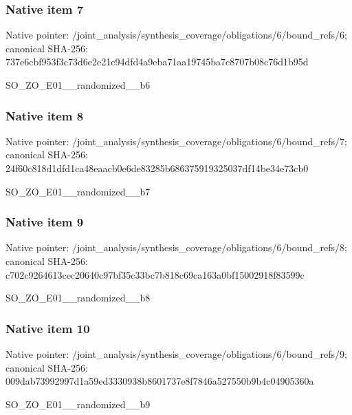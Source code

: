\documentclass[10pt,a4paper]{article}
\begin{document}
\subsubsection{Native item 7}
Native pointer: /joint\_\allowbreak{}analysis/synthesis\_\allowbreak{}coverage/obligations/6/bound\_\allowbreak{}refs/6; canonical SHA-256: 737e6cbf953f3c73d6e2e21c94dfd4a9eba71aa19745ba7c8707b08c76d1b95d

\begingroup\raggedright\sloppy SO\_\allowbreak{}ZO\_\allowbreak{}E01\_\allowbreak{}\_\allowbreak{}randomized\_\allowbreak{}\_\allowbreak{}b6\par\endgroup

\subsubsection{Native item 8}
Native pointer: /joint\_\allowbreak{}analysis/synthesis\_\allowbreak{}coverage/obligations/6/bound\_\allowbreak{}refs/7; canonical SHA-256: 24f60c818d1dfd1ca48eaacb0e6de83285b686375919325037df14be34e73cb0

\begingroup\raggedright\sloppy SO\_\allowbreak{}ZO\_\allowbreak{}E01\_\allowbreak{}\_\allowbreak{}randomized\_\allowbreak{}\_\allowbreak{}b7\par\endgroup

\subsubsection{Native item 9}
Native pointer: /joint\_\allowbreak{}analysis/synthesis\_\allowbreak{}coverage/obligations/6/bound\_\allowbreak{}refs/8; canonical SHA-256: c702c9264613cec20640c97bf35c33bc7b818c69ca163a0bf15002918f83599c

\begingroup\raggedright\sloppy SO\_\allowbreak{}ZO\_\allowbreak{}E01\_\allowbreak{}\_\allowbreak{}randomized\_\allowbreak{}\_\allowbreak{}b8\par\endgroup

\subsubsection{Native item 10}
Native pointer: /joint\_\allowbreak{}analysis/synthesis\_\allowbreak{}coverage/obligations/6/bound\_\allowbreak{}refs/9; canonical SHA-256: 009dab73992997d1a59ed3330938b8601737e8f7846a527550b9b4c04905360a

\begingroup\raggedright\sloppy SO\_\allowbreak{}ZO\_\allowbreak{}E01\_\allowbreak{}\_\allowbreak{}randomized\_\allowbreak{}\_\allowbreak{}b9\par\endgroup
\end{document}
